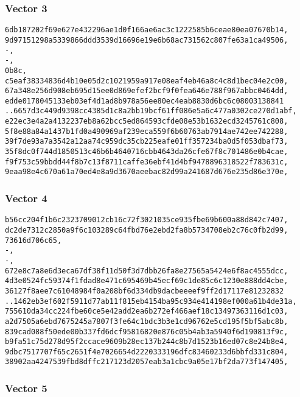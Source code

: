 \documentclass[
]{article}
\begin{document}
\hypertarget{vector-3-1}{%
\subsubsection{Vector 3}\label{vector-3-1}}

\begin{verbatim}
6db187202f69e627e432296ae1d0f166ae6ac3c1222585b6ceae80ea07670b14,
9d97151298a5339866ddd3539d16696e19e6b68ac731562c807fe63a1ca49506,
-,
-,
0b8c,
c5eaf38334836d4b10e05d2c1021959a917e08eaf4eb46a8c4c8d1bec04e2c00,
67a348e256d908eb695d15ee0d869efef2bcf9f0fea646e788f967abbc0464dd,
edde0178045133eb03ef4d1ad8b978a56ee80ec4eab8830d6bc6c08003138841
..6657d3c449d9398cc4385d1c8a2bb19bcf61ff086e5a6c477a0302ce270d1abf,
e22ec3e4a2a4132237eb8a62bcc5ed864593cfde08e53b1632ecd3245761c808,
5f8e88a84a1437b1fd0a490969af239eca559f6b60763ab7914ae742ee742288,
39f7de93a7a3542a12aa74c959dc35cb225eafe01ff357234ba0d5f053dbaf73,
35f8dc0f744d1850513c46b6b4640716cbb4643da26cfe67f8c701486e0b4cae,
f9f753c59bbdd44f8b7c13f8711caffe36ebf41d4bf9478896318522f783631c,
9eaa98e4c670a61a70ed4e8a9d3670aeebac82d99a241687d676e235d86e370e,
\end{verbatim}

\hypertarget{vector-4-1}{%
\subsubsection{Vector 4}\label{vector-4-1}}

\begin{verbatim}
b56cc204f1b6c2323709012cb16c72f3021035ce935fbe69b600a88d842c7407,
dc2de7312c2850a9f6c103289c64fbd76e2ebd2fa8b5734708eb2c76c0fb2d99,
73616d706c65,
-,
-,
672e8c7a8e6d3eca67df38f11d50f3d7dbb26fa8e27565a5424e6f8ac4555dcc,
4d3e0524fc59374f1fdad8e471c695469b45ecf69c1de85c6c1230e888dd4cbe,
36127f8aee7c61048984f0a208bf6d334db9dacbeeeef9ff2d17117e81232832
..1462eb3ef602f5911d77ab11f815eb4154ba95c934e414198ef000a61b4de31a,
755610da34cc224fbe60ce5e42add2ea6b272ef466aef18c13497363116d1c03,
a2d7505a6ebd7675245a7807f3fe64c1bdc3b3e1cd96762e5cd195f5bf5abc8b,
839cad088f50ede00b337fd6dcf95816820e876c05b4ab3a5940f6d190813f9c,
b9fa51c75d278d95f2ccace9609b28ec137b244c8b7d1523b16ed07c8e24b8e4,
9dbc7517707f65c2651f4e7026654d2220333196dfc83460233d6bbfd331c804,
38902aa4247539fbd8dffc217123d2057eab3a1cbc9a05e17bf2da773f147405,
\end{verbatim}

\hypertarget{vector-5-1}{%
\subsubsection{Vector 5}\label{vector-5-1}}
\end{document}
